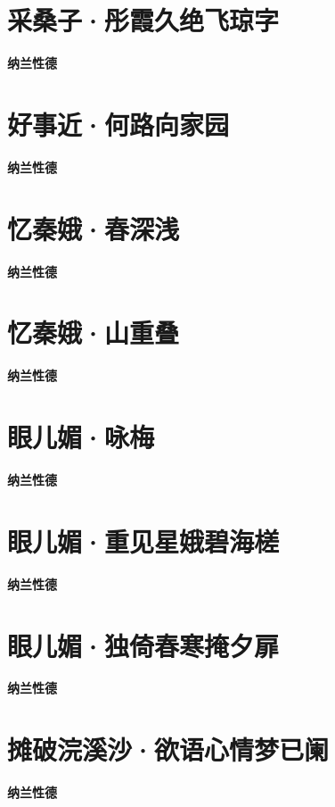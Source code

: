 \documentclass[12pt,a4paper]{ctexbook}
\begin{document}
\section{采桑子·彤霞久绝飞琼字}
\textbf{纳兰性德}\par\vspace{0.5em}

\section{好事近·何路向家园}
\textbf{纳兰性德}\par\vspace{0.5em}

\section{忆秦娥·春深浅}
\textbf{纳兰性德}\par\vspace{0.5em}

\section{忆秦娥·山重叠}
\textbf{纳兰性德}\par\vspace{0.5em}

\section{眼儿媚·咏梅}
\textbf{纳兰性德}\par\vspace{0.5em}

\section{眼儿媚·重见星娥碧海槎}
\textbf{纳兰性德}\par\vspace{0.5em}

\section{眼儿媚·独倚春寒掩夕扉}
\textbf{纳兰性德}\par\vspace{0.5em}

\section{摊破浣溪沙·欲语心情梦已阑}
\textbf{纳兰性德}\par\vspace{0.5em}
\end{document}
